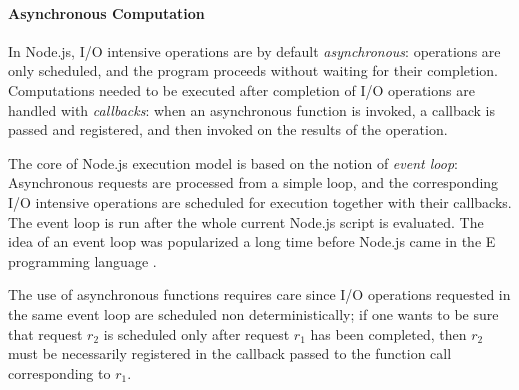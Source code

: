 \paragraph{Asynchronous Computation}
In Node.js, %
I/O intensive operations are by default \emph{asynchronous}: operations are only scheduled, and the program proceeds without waiting for their completion.
Computations needed to be executed after completion of I/O operations are handled with \emph{callbacks}: when an asynchronous function is invoked, a callback is passed and registered, and then invoked on the results of the operation.

The core of Node.js execution model is based on the notion of \emph{event loop}: Asynchronous requests are processed from a simple loop,
and the corresponding I/O intensive operations are scheduled for execution together with their callbacks.
The event loop is run after the whole current Node.js script is evaluated.
The idea of an event loop was popularized a long time before Node.js came in the E programming language \cite{eventloop}.

The use of asynchronous functions requires care since I/O operations requested in the same event loop are scheduled non deterministically;
if one wants to be sure that request $r_2$ is scheduled only after request $r_1$ has been completed, then
$r_2$ must be necessarily registered in the callback passed to the function call corresponding to $r_1$.

